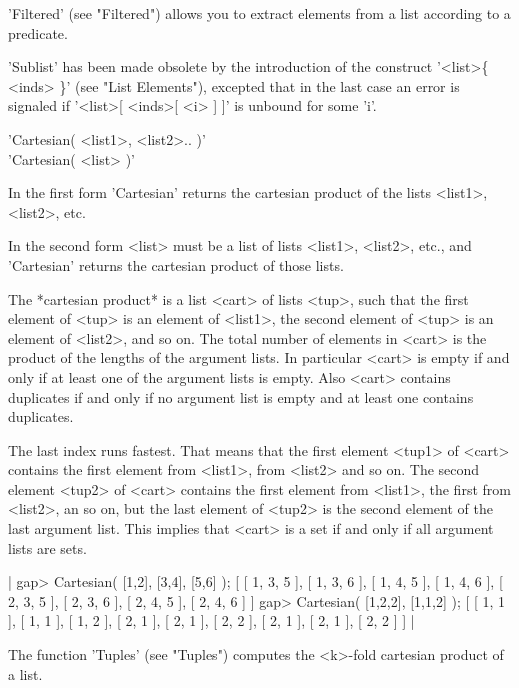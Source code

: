 'Filtered'  (see "Filtered")  allows you  to extract  elements from  a list
according to a predicate.

'Sublist'  has  been  made  obsolete  by  the introduction of the construct
'<list>\{  <inds> \}' (see "List Elements"), excepted that in the last case
an error is signaled if '<list>[ <inds>[ <i> ] ]' is unbound for some 'i'.

%

'Cartesian( <list1>, <list2>.. )' \\
'Cartesian( <list> )'

In the first form 'Cartesian' returns  the cartesian product of the lists
<list1>, <list2>, etc.

In the second form <list> must be a list of lists <list1>, <list2>, etc.,
and 'Cartesian' returns the cartesian product of those lists.

The *cartesian  product* is a list <cart>  of lists <tup>,  such that the
first  element of <tup> is  an element of  <list1>, the second element of
<tup> is an element of <list2>, and so on.   The total number of elements
in  <cart> is the   product of the  lengths  of the  argument  lists.  In
particular <cart> is empty  if and only if  at least one of  the argument
lists  is  empty.  Also <cart>   contains duplicates  if  and only  if no
argument list is empty and at least one contains duplicates.

The last index runs fastest.  That means that the first element <tup1> of
<cart> contains  the first element from <list1>,  from <list2> and so on.
The second   element <tup2>  of <cart> contains   the  first element from
<list1>, the first from <list2>, an so on, but the last element of <tup2>
is  the  second element  of the  last argument  list.   This implies that
<cart> is a set if and only if all argument lists are sets.

|    gap> Cartesian( [1,2], [3,4], [5,6] );
    [ [ 1, 3, 5 ], [ 1, 3, 6 ], [ 1, 4, 5 ], [ 1, 4, 6 ], [ 2, 3, 5 ],
      [ 2, 3, 6 ], [ 2, 4, 5 ], [ 2, 4, 6 ] ]
    gap> Cartesian( [1,2,2], [1,1,2] );
    [ [ 1, 1 ], [ 1, 1 ], [ 1, 2 ], [ 2, 1 ], [ 2, 1 ], [ 2, 2 ], 
      [ 2, 1 ], [ 2, 1 ], [ 2, 2 ] ] |

The function 'Tuples'   (see  "Tuples") computes the   <k>-fold cartesian
product of a list.

%

